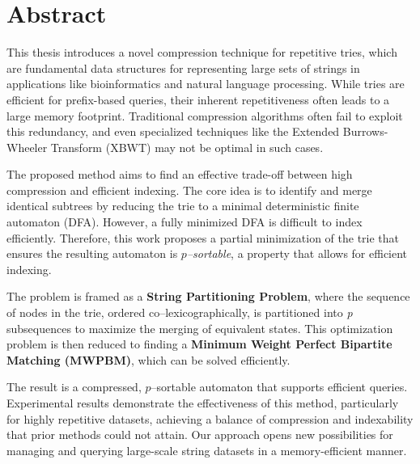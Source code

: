 \chapter*{Abstract}


This thesis introduces a novel compression technique for repetitive tries, which are fundamental data structures for representing large sets of strings in applications like bioinformatics and natural language processing. While tries are efficient for prefix-based queries, their inherent repetitiveness often leads to a large memory footprint. Traditional compression algorithms often fail to exploit this redundancy, and even specialized techniques like the Extended Burrows-Wheeler Transform (XBWT) may not be optimal in such cases.

The proposed method aims to find an effective trade-off between high compression and efficient indexing. The core idea is to identify and merge identical subtrees by reducing the trie to a minimal deterministic finite automaton (DFA). However, a fully minimized DFA is difficult to index efficiently. Therefore, this work proposes a partial minimization of the trie that ensures the resulting automaton is \textit{$p$--sortable}, a property that allows for efficient indexing.

The problem is framed as a \textbf{String Partitioning Problem}, where the sequence of nodes in the trie, ordered co--lexicographically, is partitioned into \textit{p} subsequences to maximize the merging of equivalent states. This optimization problem is then reduced to finding a \textbf{Minimum Weight Perfect Bipartite Matching (MWPBM)}, which can be solved efficiently.

The result is a compressed, $p$--sortable automaton that supports efficient queries. Experimental results demonstrate the effectiveness of this method, particularly for highly repetitive datasets, achieving a balance of compression and indexability that prior methods could not attain. Our approach opens new possibilities for managing and querying large-scale string datasets in a memory-efficient manner.